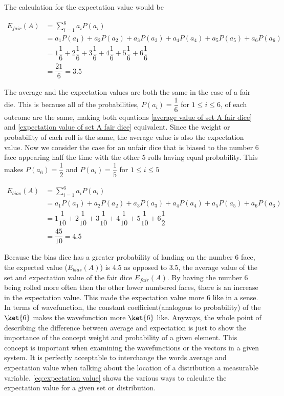 \documentclass[11pt,a4paper]{book}
\begin{document}
		The calculation for the expectation value would be
		
		\begin{equation}
		\label{expectation value of set A fair dice}
		\begin{split}
		E_{fair}(A) &= \sum_{i=1}^6{a_i P(a_i)}\\
		& =  a_1 P(a_1) + a_2 P(a_2) + a_3 P(a_3) + a_4 P(a_4) + a_5 P(a_5) + a_6 P(a_6) \\
		& =  1\dfrac{1}{6} + 2\dfrac{1}{6}+ 3\dfrac{1}{6} + 4\dfrac{1}{6} + 5\dfrac{1}{6} + 6\dfrac{1}{6}\\
		& = \dfrac{21}{6} = 3.5
		\end{split}
		\end{equation}
		
		The average and the expectation values are both the same in the case of a fair die. This is because all of the probabilities, $P(a_i)=\dfrac{1}{6}$ for $1\leq i \leq 6$, of each outcome are the same, making both equations \autoref{average value of set A fair dice} and \autoref{expectation value of set A fair dice} equivalent. Since the weight or probability of each roll is the same, the average value is also the expectation value. Now we consider the case for an unfair dice that is biased to the number 6 face appearing half the time with the other 5 rolls having equal probability. This makes $P(a_6)=\dfrac{1}{2}$ and $P(a_i)=\dfrac{1}{5}$ for $1 \leq i \leq 5$
		
		\begin{equation}
			\label{expectation value of set A unfair dice}
			\begin{split}
				E_{bias}(A) &= \sum_{i=1}^6{a_i P(a_i)}\\
				& =  a_1 P(a_1) + a_2 P(a_2) + a_3 P(a_3) + a_4 P(a_4) + a_5 P(a_5) + a_6 P(a_6) \\
				& =  1\dfrac{1}{10} + 2\dfrac{1}{10}+ 3\dfrac{1}{10} + 4\dfrac{1}{10} + 5\dfrac{1}{10} + 6\dfrac{1}{2}\\
				& = \dfrac{45}{10} = 4.5
			\end{split}
		\end{equation}
		
		Because the bias dice has a greater probability of landing on the number 6 face, the expected value ($E_{bias}(A)$) is 4.5 as opposed to 3.5, the average value of the set and expectation value of the fair dice $E_{fair}(A)$. By having the number 6 being rolled more often then the other lower numbered faces, there is an increase in the expectation value. This made the expectation value more 6 like in a sense. In terms of wavefunction, the constant coefficient(analogous to probability) of the $\ket{6}$ makes the wavefunction more $\ket{6}$ like. Anyways, the whole point of describing the difference between average and expectation is just to show the importance of the concept weight and probability of a given element. This concept is important when examining the wavefunctions or the vectors in a given system. It is perfectly acceptable to interchange the words average and expectation value when talking about the location of a distribution a measurable variable. \autoref{eq:expectation value} shows the various ways to calculate the expectation value for a given set or distribution.
			
\end{document}
